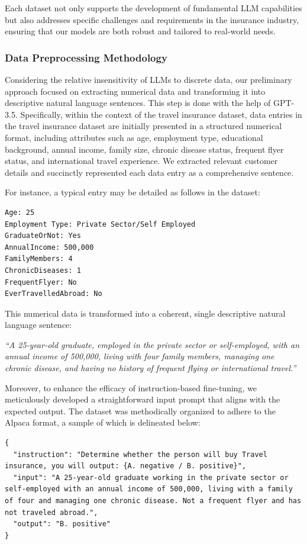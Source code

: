 \documentclass[conference]{IEEEtran}
\begin{document}
Each dataset not only supports the development of fundamental LLM capabilities but also addresses specific challenges and requirements in the insurance industry, ensuring that our models are both robust and tailored to real-world needs.

\subsubsection{Data Preprocessing Methodology}

Considering the relative insensitivity of LLMs to discrete data, our preliminary approach focused on extracting numerical data and transforming it into descriptive natural language sentences. This step is done with the help of GPT-3.5. Specifically, within the context of the travel insurance dataset, data entries in the travel insurance dataset are initially presented in a structured numerical format, including attributes such as age, employment type, educational background, annual income, family size, chronic disease status, frequent flyer status, and international travel experience. We extracted relevant customer details and succinctly represented each data entry as a comprehensive sentence.

For instance, a typical entry may be detailed as follows in the dataset:
\begin{Verbatim}[breaklines=true]
Age: 25
Employment Type: Private Sector/Self Employed
GraduateOrNot: Yes
AnnualIncome: 500,000
FamilyMembers: 4
ChronicDiseases: 1
FrequentFlyer: No
EverTravelledAbroad: No
\end{Verbatim}

This numerical data is transformed into a coherent, single descriptive natural language sentence:


\textit{``A 25-year-old graduate, employed in the private sector or self-employed, with an annual income of 500,000, living with four family members, managing one chronic disease, and having no history of frequent flying or international travel.''}


Moreover, to enhance the efficacy of instruction-based fine-tuning, we meticulously developed a straightforward input prompt that aligns with the expected output. The dataset was methodically organized to adhere to the Alpaca format, a sample of which is delineated below:

\begin{Verbatim}[breaklines=true]
{
  "instruction": "Determine whether the person will buy Travel insurance, you will output: {A. negative / B. positive}",
  "input": "A 25-year-old graduate working in the private sector or self-employed with an annual income of 500,000, living with a family of four and managing one chronic disease. Not a frequent flyer and has not traveled abroad.",
  "output": "B. positive"
}
\end{Verbatim}
\end{document}
